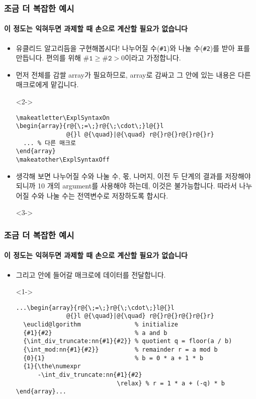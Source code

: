 
\begin{frame}[fragile]
  \frametitle{조금 더 복잡한 예시}
  \framesubtitle{이 정도는 익혀두면 과제할 때 손으로 계산할 필요가 없습니다}
  \begin{itemize}
    \item<1-> 유클리드 알고리듬을 구현해봅시다! 나누어질 수(\texttt{\#1})와 나눌 수(\texttt{\#2})를 받아 표를 만듭니다. 편의를 위해 $\texttt{\#1}\ge\texttt{\#2} > 0$이라고 가정합니다.
    \item<2-> 먼저 전체를 감쌀 array가 필요하므로, array로 감싸고 그 안에 있는 내용은 다른 매크로에게 맡깁니다.
    \item[]<2-> \vspace{-1.5em}\begin{verbatim}
\makeatletter\ExplSyntaxOn
\begin{array}{r@{\;=\;}r@{\;\cdot\;}l@{}l
              @{}l @{\quad}|@{\quad} r@{}r@{}r@{}r@{}r}
  ... % 다른 매크로
\end{array}
\makeatother\ExplSyntaxOff
    \end{verbatim}
    \item<3-> 생각해 보면 나누어질 수와 나눌 수, 몫, 나머지, 이전 두 단계의 결과를 저장해야 되니까 10 개의 argument를 사용해야 하는데, 이것은 불가능합니다. 따라서 나누어질 수와 나눌 수는 전역변수로 저장하도록 합시다.
    \item[]<3-> \texttt{\gdef\@@a{#1}\gdef\@@b{#2}}
  \end{itemize}
\end{frame}

\begin{frame}[fragile]
  \frametitle{조금 더 복잡한 예시}
  \framesubtitle{이 정도는 익혀두면 과제할 때 손으로 계산할 필요가 없습니다}
  \begin{itemize}
    \item<1-> 그리고 안에 들어갈 매크로에 데이터를 전달합니다.
    \item[]<1-> \vspace{-1.5em}\begin{verbatim}
...\begin{array}{r@{\;=\;}r@{\;\cdot\;}l@{}l
              @{}l @{\quad}|@{\quad} r@{}r@{}r@{}r@{}r}
  \euclid@lgorithm               % initialize
  {#1}{#2}                       % a and b
  {\int_div_truncate:nn{#1}{#2}} % quotient q = floor(a / b)
  {\int_mod:nn{#1}{#2}}          % remainder r = a mod b
  {0}{1}                         % b = 0 * a + 1 * b
  {1}{\the\numexpr
      -\int_div_truncate:nn{#1}{#2}
                            \relax} % r = 1 * a + (-q) * b
\end{array}...
    \end{verbatim}
  \end{itemize}
\end{frame}

